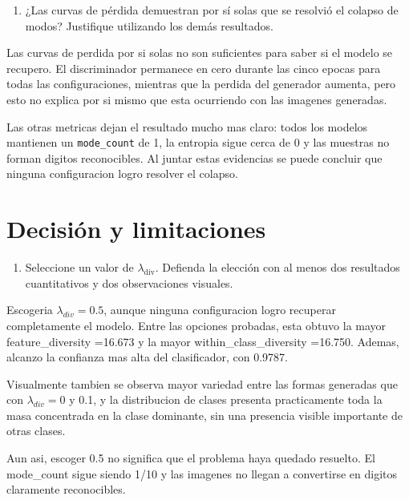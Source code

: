 \documentclass[11pt,letterpaper]{article}
\newenvironment{responsebox}{\begin{tcolorbox}[colframe=black!50]}{\end{tcolorbox}}
\begin{document}
\begin{enumerate}[resume]
  \item ¿Las curvas de pérdida demuestran por sí solas que se resolvió el
  colapso de modos? Justifique utilizando los demás resultados.
\end{enumerate}
\begin{responsebox}
Las curvas de perdida por si solas no son suficientes para saber si el modelo se recupero. El discriminador permanece en cero durante las cinco epocas para todas las configuraciones, mientras que la perdida del generador aumenta, pero esto no explica por si mismo que esta ocurriendo con las imagenes generadas.

Las otras metricas dejan el resultado mucho mas claro: todos los modelos mantienen un \texttt{mode\_count} de 1, la entropia sigue cerca de 0 y las muestras no forman digitos reconocibles. Al juntar estas evidencias se puede concluir que ninguna configuracion logro resolver el colapso.
\end{responsebox}

\section{Decisión y limitaciones}

\begin{enumerate}[resume]
  \item Seleccione un valor de $\lambda_{\mathrm{div}}$. Defienda la elección
  con al menos dos resultados cuantitativos y dos observaciones visuales.
\end{enumerate}
\begin{responsebox}
Escogeria $\lambda_{div}=0.5$, aunque ninguna configuracion logro recuperar completamente el modelo. Entre las opciones probadas, esta obtuvo la mayor feature_diversity =16.673 y la mayor within_class_diversity =16.750. Ademas, alcanzo la confianza mas alta del clasificador, con 0.9787.

Visualmente tambien se observa mayor variedad entre las formas generadas que con $\lambda_{div}=0$ y 0.1, y la distribucion de clases presenta practicamente toda la masa concentrada en la clase dominante, sin una presencia visible importante de otras clases.

Aun asi, escoger 0.5 no significa que el problema haya quedado resuelto. El mode_count sigue siendo 1/10 y las imagenes no llegan a convertirse en digitos claramente reconocibles. 
\end{responsebox}
\end{document}
